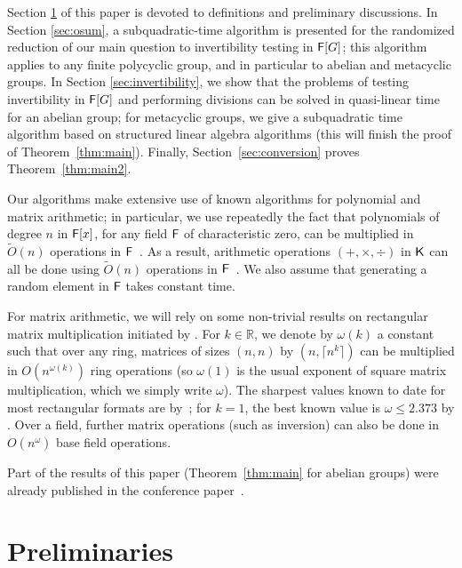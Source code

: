 Section \ref{sec:pre} of this paper is devoted to definitions and
preliminary discussions.  In Section \ref{sec:osum}, a
subquadratic-time algorithm is presented for the randomized reduction
of our main question to invertibility testing in ${\mathsf{F}}[G]$; this
algorithm applies to any finite polycyclic group, and in particular to
abelian and metacyclic groups. In Section \ref{sec:invertibility}, we
show that the problems of testing invertibility in ${\mathsf{F}}[G]$ and
performing divisions can be solved in quasi-linear time for an abelian
group; for metacyclic groups, we give a subquadratic time algorithm
based on structured linear algebra algorithms (this will finish the
proof of Theorem~\ref{thm:main}). Finally,
Section~\ref{sec:conversion} proves Theorem~\ref{thm:main2}.

Our algorithms make extensive use of known algorithms for polynomial and
matrix arithmetic; in particular, we use repeatedly the fact that
polynomials of degree $n$ in ${\mathsf{F}}[x]$, for any field ${\mathsf{F}}$ of
characteristic zero, can be multiplied in $\tilde{O}(n)$ operations in
${\mathsf{F}}$~\citep{ScSt71}. As a result, arithmetic operations
$(+,\times,\div)$ in ${\mathsf{K}}$ can all be done using $\tilde{O}(n)$
operations in ${\mathsf{F}}$~\citep{vzGathen13}. We also assume that generating a
random element in ${\mathsf{F}}$ takes constant time.

For matrix arithmetic, we will rely on some non-trivial results on
rectangular matrix multiplication initiated by \cite{LoRo83}. For $k
\in \mathbb{R}$, we denote by $\omega(k)$ a constant such that over
any ring, matrices of sizes $(n,n)$ by $(n,\lceil n^k \rceil)$ can be
multiplied in $O(n^{\omega(k)})$ ring operations (so $\omega(1)$ is
the usual exponent of square matrix multiplication, which we simply
write $\omega$).  The sharpest values known to date for most
rectangular formats are by~\cite{LeGall}; for $k=1$, the best known
value is $\omega \le 2.373$ by .  Over a field,
further matrix operations (such as inversion) can also be done in
$O(n^\omega)$ base field operations.

Part of the results of this paper (Theorem~\ref{thm:main} for abelian
groups) were already published in the conference
paper~\citep{GiJaSc19}.

 \section{Preliminaries}
\label{sec:pre}


